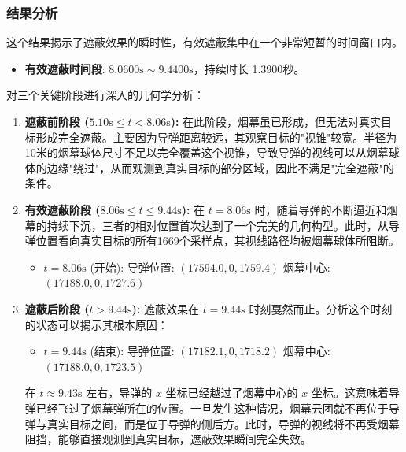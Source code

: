 \documentclass[5pt, withoutpreface,bwprint]{cumcmthesis} %
\begin{document}
\subsubsection{结果分析}
这个结果揭示了遮蔽效果的瞬时性，有效遮蔽集中在一个非常短暂的时间窗口内。
\begin{itemize}
    \item \textbf{有效遮蔽时间段}: \textbf{$8.0600\text{s} \sim 9.4400\text{s}$}，持续时长 1.3900秒。
\end{itemize}
对三个关键阶段进行深入的几何学分析：
\begin{enumerate}
    \item \textbf{遮蔽前阶段 ($5.10\text{s} \le t < 8.06\text{s}$):}
    在此阶段，烟幕虽已形成，但无法对真实目标形成完全遮蔽。主要因为导弹距离较远，其观察目标的"视锥"较宽。半径为10米的烟幕球体尺寸不足以完全覆盖这个视锥，导致导弹的视线可以从烟幕球体的边缘"绕过"，从而观测到真实目标的部分区域，因此不满足"完全遮蔽"的条件。
    \item \textbf{有效遮蔽阶段 ($8.06\text{s} \le t \le 9.44\text{s}$):}
    在 $t=8.06\text{s}$ 时，随着导弹的不断逼近和烟幕的持续下沉，三者的相对位置首次达到了一个完美的几何构型。此时，从导弹位置看向真实目标的所有1669个采样点，其视线路径均被烟幕球体所阻断。
        \begin{itemize}
            \item $t=8.06\text{s}$ (开始):\quad
           导弹位置: $(17594.0, 0, 1759.4)$\quad             
                 烟幕中心: $(17188.0, 0, 1727.6)$
           
        \end{itemize}
        
    \item \textbf{遮蔽后阶段 ($t > 9.44\text{s}$):}
    遮蔽效果在 $t=9.44\text{s}$ 时刻戛然而止。分析这个时刻的状态可以揭示其根本原因：
        \begin{itemize}
            \item $t=9.44\text{s}$ (结束):\quad            
             导弹位置: $(17182.1, 0, 1718.2)$\quad             
                烟幕中心: $(17188.0, 0, 1723.5)$
           
        \end{itemize}
   \hspace{2em}在 $t \approx 9.43\text{s}$ 左右，导弹的 $x$ 坐标已经越过了烟幕中心的 $x$ 坐标。这意味着导弹已经飞过了烟幕弹所在的位置。一旦发生这种情况，烟幕云团就不再位于导弹与真实目标之间，而是位于导弹的侧后方。此时，导弹的视线将不再受烟幕阻挡，能够直接观测到真实目标，遮蔽效果瞬间完全失效。
\end{enumerate}
\end{document}

